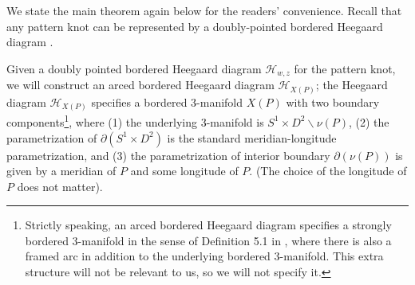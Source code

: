 \documentclass{amsart}
\theoremstyle{definition}
\theoremstyle{remark}
\numberwithin{equation}{section}
\numberwithin{equation}{section} \makeatletter
\begin{document}
We state the main theorem again below for the readers' convenience. Recall that any pattern knot can be represented by a doubly-pointed bordered Heegaard diagram \cite[Section 11.4]{LOT18}.
\MainTheorem*

Given a doubly pointed bordered Heegaard diagram $\mathcal{H}_{w,z}$ for the pattern knot, we will construct an arced bordered Heegaard diagram $\mathcal{H}_{X(P)}$; the Heegaard diagram $\mathcal{H}_{X(P)}$ specifies a bordered 3-manifold $X(P)$ with two boundary components\footnote{Strictly speaking, an arced bordered Heegaard diagram specifies a strongly bordered 3-manifold in the sense of Definition 5.1 in \cite{Lipshitz2015}, where there is also a framed arc in addition to the underlying bordered 3-manifold. This extra structure will not be relevant to us, so we will not specify it. }, where (1) the underlying 3-manifold is $S^1\times D^2\backslash \nu(P)$, (2) the parametrization of $\partial (S^1\times D^2)$ is the standard meridian-longitude parametrization, and (3) the parametrization of interior boundary $\partial (\nu(P))$ is given by a meridian of $P$ and some longitude of $P$. (The choice of the longitude of $P$ does not matter).
\end{document}
